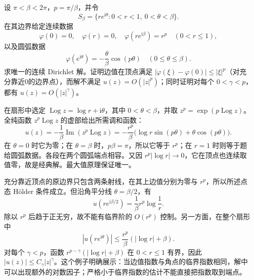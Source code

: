 \begin{exercise}\label{b3:ex:16-draft-07}
设 \(\pi<\beta<2\pi\)，\(p=\pi/\beta\)，并令
\[
 S_\beta=\{re^{\mathrm i\theta}:0<r<1,\ 0<\theta<\beta\}.
\]
在其边界给定连续数据
\[
 \varphi(0)=0,\quad
 \varphi(r)=0,\quad
 \varphi(re^{\mathrm i\beta})=r^p\quad(0<r\le1),
\]
以及圆弧数据
\[
 \varphi(e^{\mathrm i\theta})=-\frac\theta\beta\cos(p\theta)
 \quad(0\le\theta\le\beta).
\]
求唯一的连续 Dirichlet 解。证明边值在顶点满足 \(|\varphi(\xi)-\varphi(0)|\le|\xi|^p\)（对充分靠近0的边界点），而解不满足 \(u(z)=O(|z|^p)\)；同时证明对每个 \(0<\gamma<p\)，都有 \(u(z)=O(|z|^\gamma)\)。
\end{exercise}
\begin{solution}
在扇形中选定 \(\operatorname{Log}z=\log r+\mathrm i\theta\)，其中 \(0<\theta<\beta\)，并取 \(z^p=\exp(p\operatorname{Log}z)\)。全纯函数 \(z^p\operatorname{Log}z\) 的虚部给出所需调和函数：
\[
 u(z)=-\frac1\beta\operatorname{Im}(z^p\operatorname{Log}z)
 =-\frac{r^p}{\beta}
       \bigl(\log r\sin(p\theta)+\theta\cos(p\theta)\bigr).
\]
在 \(\theta=0\) 时它为零；在 \(\theta=\beta\) 时，\(p\beta=\pi\)，所以它等于 \(r^p\)；在 \(r=1\) 时则等于题给圆弧数据。各段在两个圆弧端点相容。又因 \(r^p|\log r|\to0\)，它在顶点也连续取值零，故是经典解。最大值原理保证唯一。

充分靠近顶点的原边界只包含两条射线，在其上边值分别为零与 \(r^p\)，所以所述点态 Hölder 条件成立。但沿角平分线 \(\theta=\beta/2\)，有
\[
 u(re^{\mathrm i\beta/2})
 =\frac1\beta r^p\log\frac1r.
\]
除以 \(r^p\) 后趋于正无穷，故不能有临界阶的 \(O(r^p)\) 控制。另一方面，在整个扇形中
\[
 |u(re^{\mathrm i\theta})|
 \le\frac{r^p}{\beta}(|\log r|+\beta).
\]
对每个 \(\gamma<p\)，函数 \(r^{p-\gamma}(|\log r|+\beta)\) 在 \(0<r\le1\) 有界，因此 \(|u(z)|\le C_\gamma|z|^\gamma\)。这个例子明确展示：当边值指数与角点的临界指数相同，解中可以出现额外的对数因子；严格小于临界指数的估计不能直接把指数取到端点。
\end{solution}

